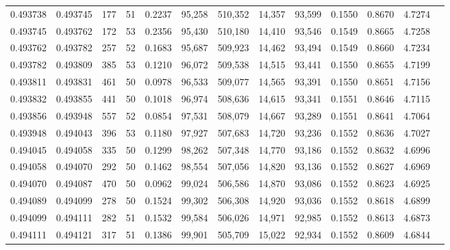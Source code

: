 \begin{tabular}{rrrrrrrrrrrrr}
0.493738 & 0.493745 & 177 &  51 &                                     0.2237 &  95,258 & 510,352 &  14,357 &  93,599 & 0.1550 & 0.8670 & 4.7274 \\
0.493745 & 0.493762 & 172 &  53 &                                     0.2356 &  95,430 & 510,180 &  14,410 &  93,546 & 0.1549 & 0.8665 & 4.7258 \\
0.493762 & 0.493782 & 257 &  52 &                                     0.1683 &  95,687 & 509,923 &  14,462 &  93,494 & 0.1549 & 0.8660 & 4.7234 \\
0.493782 & 0.493809 & 385 &  53 &                                     0.1210 &  96,072 & 509,538 &  14,515 &  93,441 & 0.1550 & 0.8655 & 4.7199 \\
0.493811 & 0.493831 & 461 &  50 &                                     0.0978 &  96,533 & 509,077 &  14,565 &  93,391 & 0.1550 & 0.8651 & 4.7156 \\
0.493832 & 0.493855 & 441 &  50 &                                     0.1018 &  96,974 & 508,636 &  14,615 &  93,341 & 0.1551 & 0.8646 & 4.7115 \\
0.493856 & 0.493948 & 557 &  52 &                                     0.0854 &  97,531 & 508,079 &  14,667 &  93,289 & 0.1551 & 0.8641 & 4.7064 \\
0.493948 & 0.494043 & 396 &  53 &                                     0.1180 &  97,927 & 507,683 &  14,720 &  93,236 & 0.1552 & 0.8636 & 4.7027 \\
0.494045 & 0.494058 & 335 &  50 &                                     0.1299 &  98,262 & 507,348 &  14,770 &  93,186 & 0.1552 & 0.8632 & 4.6996 \\
0.494058 & 0.494070 & 292 &  50 &                                     0.1462 &  98,554 & 507,056 &  14,820 &  93,136 & 0.1552 & 0.8627 & 4.6969 \\
0.494070 & 0.494087 & 470 &  50 &                                     0.0962 &  99,024 & 506,586 &  14,870 &  93,086 & 0.1552 & 0.8623 & 4.6925 \\
0.494089 & 0.494099 & 278 &  50 &                                     0.1524 &  99,302 & 506,308 &  14,920 &  93,036 & 0.1552 & 0.8618 & 4.6899 \\
0.494099 & 0.494111 & 282 &  51 &                                     0.1532 &  99,584 & 506,026 &  14,971 &  92,985 & 0.1552 & 0.8613 & 4.6873 \\
0.494111 & 0.494121 & 317 &  51 &                                     0.1386 &  99,901 & 505,709 &  15,022 &  92,934 & 0.1552 & 0.8609 & 4.6844 \\

\end{tabular}
